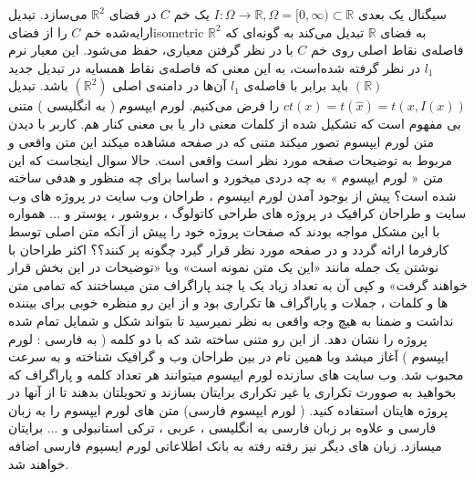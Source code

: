 سیگنال یک بعدی
 $I : \Omega \rightarrow \mathbb{R}, \Omega = [0 , \infty ) \subset \mathbb{R}$ 
 یک خم $C$ در فضای $\mathbb{R}^2$ می‌سازد. تبدیل ارایه‌شده خم $C$ را از فضایisometric $\mathbb{R}^2$ به فضای $\mathbb{R}$ تبدیل می‌کند به گونه‌ای که فاصله‌ی نقاط اصلی روی خم $C$ با در نظر گرفتن معیاری، حفظ می‌شود. این معیار نرم $l_1$ در نظر گرفته شده‌است، به این معنی که فاصله‌ی نقاط همسایه در تبدیل جدید $(\mathbb{R})$ باید برابر با فاصله‌ی $l_1$ آن‌ها در دامنه‌ی اصلی $(\mathbb{R}^2)$ باشد. تبدیل 
 $ct(x) = t(\hat{x}) = t(x , I(x))$
 را فرض می‌کنیم. لورم ایپسوم ( به انگلیسی  ) متنی بی مفهوم است که تشکیل شده از کلمات معنی دار یا بی معنی کنار هم. کاربر با دیدن متن لورم ایپسوم تصور میکند متنی که در صفحه مشاهده میکند این متن واقعی و مربوط به توضیحات صفحه مورد نظر است واقعی است. حالا سوال اینجاست که این متن « لورم ایپسوم » به چه دردی میخورد و اساسا برای چه منظور و هدفی ساخته شده است؟ پیش از بوجود آمدن لورم ایپسوم ، طراحان وب سایت در پروژه های وب سایت و طراحان کرافیک در پروژه های طراحی کاتولوگ ، بروشور ، پوستر و ... همواره با این مشکل مواجه بودند که صفحات پروژه خود را پیش از آنکه متن اصلی توسط کارفرما ارائه گردد و در صفحه مورد نظر قرار گیرد چگونه پر کنند؟؟ اکثر طراحان با نوشتن یک جمله مانند «این یک متن نمونه است» ویا «توضیحات در این بخش قرار خواهند گرفت» و کپی آن به تعداد زیاد یک یا چند پاراگراف متن میساختند که تمامی متن ها و کلمات ، جملات و پاراگراف ها تکراری بود و از این رو منظره خوبی برای بیننده نداشت و ضمنا به هیچ وجه واقعی به نظر نمیرسید تا بتواند شکل و شمایل تمام شده پروژه را نشان دهد. از این رو متنی ساخته شد که با دو کلمه ( به فارسی : لورم ایپسوم ) آغاز میشد وبا همین نام در بین طراحان وب و گرافیک شناخته و به سرعت محبوب شد. وب سایت های سازنده لورم ایپسوم میتوانند هر تعداد کلمه و پاراگراف که بخواهید به صوورت تکراری یا غیر تکراری برایتان بسازند و تحویلتان بدهند تا از آنها در پروژه هایتان استفاده کنید. ( لورم ایپسوم فارسی) متن های لورم ایپسوم را به زبان فارسی و علاوه بر زبان فارسی به انگلیسی ، عربی ، ترکی استانبولی و ... برایتان میسازد. زبان های دیگر نیز رفته رفته به بانک اطلاعاتی لورم ایسپوم فارسی اضافه خواهند شد.  

